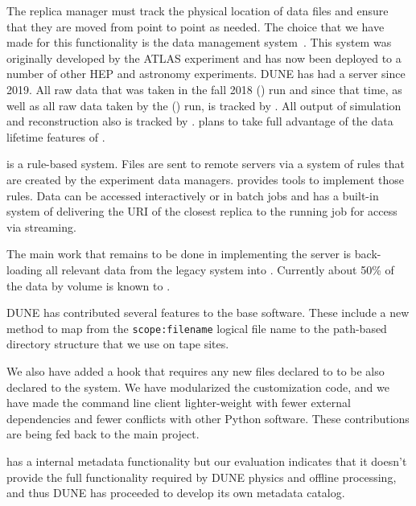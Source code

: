 \documentclass[../main-v1.tex]{subfiles}
\begin{document}
The replica manager must track the physical location of  data files %
and ensure that they 
are moved from point to point as needed. The choice  that we have made 
for this functionality is the  data
management system~\cite{Baritsis:2019csbs}.  This system was originally developed by the ATLAS experiment and has now been deployed to 
a number of other HEP and astronomy experiments.  DUNE has had a  server since 2019.  All raw data that was
taken in the fall 2018  () run and since that time, as well as all raw data taken by the  () run, is tracked by .  All output of  simulation and reconstruction also is tracked by .  plans to take full advantage of the data lifetime features of .

 is a rule-based system.  Files are sent to remote servers via a system of rules
that are created by the experiment data managers.  provides tools to implement those rules.   Data can be accessed interactively or in batch jobs and
 has a built-in system of delivering the URI of the closest replica to the running job for access via streaming.

The main work that remains to be done in implementing the  server is  back-loading all relevant 
data from the legacy  system into .  Currently about 50\% of the data by volume is known to .   

DUNE has contributed several features to the  base software.  These include a new method to map from the \texttt{scope:filename} logical file name to the path-based directory structure that we use on tape sites.  

We also have added a hook that requires any new files declared to  to be also declared to the  system.  We have modularized the  customization code, and we have made the command line client lighter-weight with fewer external dependencies and fewer conflicts with other Python software.  These contributions are being fed back to the main  project.  

 has a internal metadata functionality but our evaluation indicates that it doesn't provide the full functionality required by DUNE physics and offline processing,%
and thus DUNE has proceeded to develop its own metadata catalog. 
\end{document}
